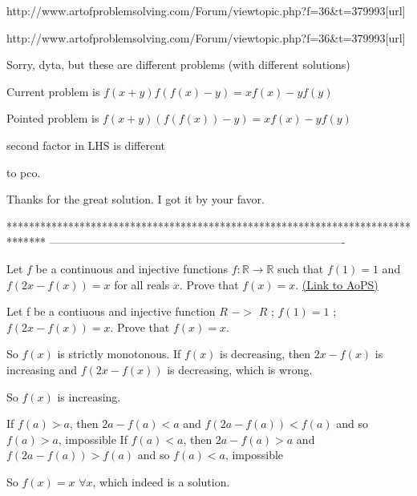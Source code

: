 \begin{solution}http://www.artofproblemsolving.com/Forum/viewtopic.php?f=36&t=379993[\/url]
\end{solution}



\begin{solution}
	\begin{tcolorbox}[url]http://www.artofproblemsolving.com/Forum/viewtopic.php?f=36&t=379993[\/url]\end{tcolorbox}
Sorry, dyta, but these are different problems (with different solutions)

Current problem is $f(x+y)f( f(x)-y)=xf(x)-yf(y)$
 
Pointed problem is $f(x+y)(f(f(x))-y)=xf(x)-yf(y)$

second factor in LHS is different
\end{solution}



\begin{solution}
	to pco.

Thanks for the great solution. I got it by your favor.
\end{solution}
*******************************************************************************
-------------------------------------------------------------------------------

\begin{problem}
	Let $f$ be a continuous and injective functions $f: \mathbb R \to \mathbb R$ such that $f(1)=1$ and $f(2x-f(x))=x$ for all reals $x$. Prove that $f(x)=x$.
	\flushright \href{https://artofproblemsolving.com/community/c6h399730}{(Link to AoPS)}
\end{problem}



\begin{solution}
	\begin{tcolorbox}Let f be a contiuous and injective function $R$  $->$  $R$ ;  $f(1)=1$  ;          $f(2x-f(x))=x$.  Prove that $f(x)=x$.\end{tcolorbox}
So $f(x)$ is strictly monotonous.
If $f(x)$ is decreasing, then $2x-f(x)$ is increasing and $f(2x-f(x))$ is decreasing, which is wrong.

So $f(x)$ is increasing.

If $f(a)>a$, then $2a-f(a)<a$ and $f(2a-f(a))<f(a)$ and so $f(a)>a$, impossible
If $f(a)<a$, then $2a-f(a)>a$ and $f(2a-f(a))>f(a)$ and so $f(a)<a$, impossible

So $\boxed{f(x)=x}$ $\forall x$, which indeed is a solution.
\end{solution}



